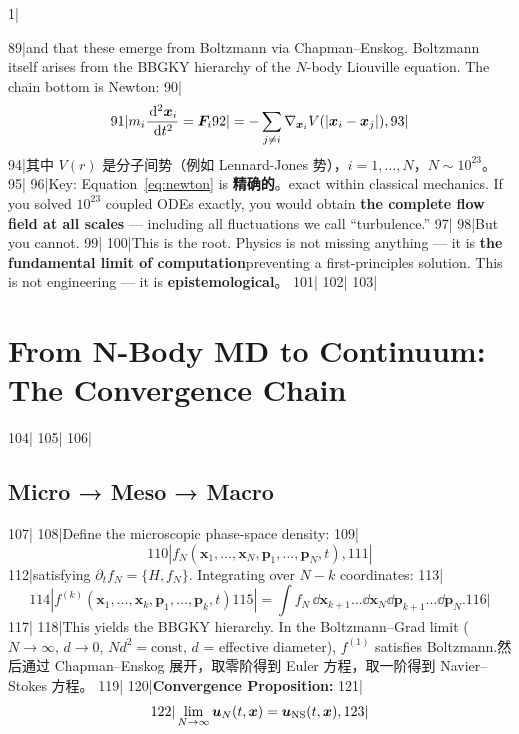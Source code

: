 1|\documentclass[11pt,a4paper]{article}
\begin{document}
89|and that these emerge from Boltzmann via Chapman--Enskog. Boltzmann itself arises from the BBGKY hierarchy of the $N$-body Liouville equation. The chain bottom is Newton:
90|\begin{equation}\label{eq:newton}
91|  m_i \frac{\,\mathrm{d}^2 \bm{x}_i}{\,\mathrm{d} t^2} = \bm{F}_i
92|  = -\sum_{j\neq i} \nabla_{\bm{x}_i} V(\left\lvert\bm{x}_i - \bm{x}_j\right\rvert),
93|\end{equation}
94|其中 $V(r)$ 是分子间势（例如 Lennard-Jones 势），$i=1,\dots,N$，$N\sim 10^{23}$。
95|
96|Key: Equation~\eqref{eq:newton} is \textbf{精确的}。exact within classical mechanics. If you solved $10^{23}$ coupled ODEs exactly, you would obtain \textbf{the complete flow field at all scales} — including all fluctuations we call ``turbulence.''
97|
98|But you cannot.
99|
100|This is the root. Physics is not missing anything — it is \textbf{the fundamental limit of computation}preventing a first-principles solution. This is not engineering — it is \textbf{epistemological}。
101|
102|%
103|\section{From N-Body MD to Continuum: The Convergence Chain}
104|%
105|
106|\subsection{Micro → Meso → Macro}
107|
108|Define the microscopic phase-space density:
109|\begin{equation}\label{eq:liouville}
110|  f_N(\bm{x}_1,\dots,\bm{x}_N,\bm{p}_1,\dots,\bm{p}_N,t),
111|\end{equation}
112|satisfying $\partial_t f_N = \{H, f_N\}$. Integrating over $N-k$ coordinates:
113|\begin{equation}\label{eq:bggky}
114|  f^{(k)}(\bm{x}_1,\dots,\bm{x}_k,\bm{p}_1,\dots,\bm{p}_k,t)
115|  = \int f_N \,\dd\bm{x}_{k+1}\dots\dd\bm{x}_N\dd\bm{p}_{k+1}\dots\dd\bm{p}_N.
116|\end{equation}
117|
118|This yields the BBGKY hierarchy. In the Boltzmann--Grad limit ($N\to\infty$, $d\to 0$, $Nd^2 = \text{const}$, $d$ = effective diameter), $f^{(1)}$ satisfies Boltzmann.然后通过 Chapman--Enskog 展开，取零阶得到 Euler 方程，取一阶得到 Navier--Stokes 方程。
119|
120|\textbf{Convergence Proposition:}
121|\begin{equation}\label{eq:convergence}
122|  \lim_{N\to\infty} \bm{u}_N(t,\bm{x}) = \bm{u}_{\text{NS}}(t,\bm{x}),
123|\end{equation}
\end{document}
